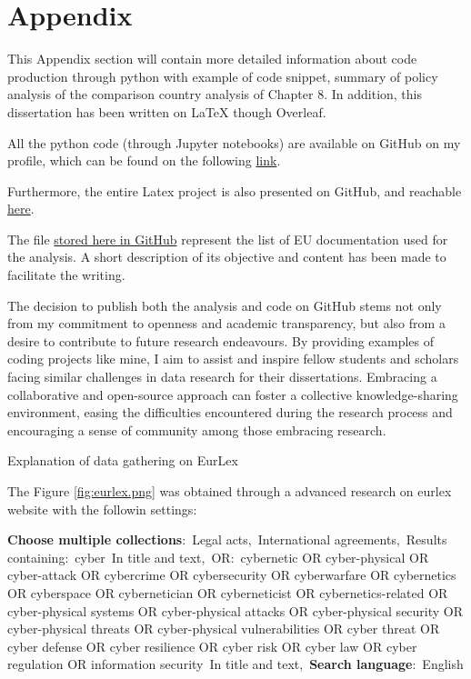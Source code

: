 \chapter*{Appendix}
{}

This Appendix section will contain more detailed information about code production through python with example of code snippet, summary of policy analysis of the comparison country analysis of Chapter 8. In addition, this dissertation has been written on LaTeX though Overleaf. 

All the python code (through Jupyter notebooks) are available on GitHub on my profile, which can be found on the following \href{https://github.com/esterinJ/Disssertation}{link}.

Furthermore, the entire Latex project is also presented on GitHub, and reachable \href{https://github.com/esterinJ/Kojtari_Cyber_Lessons_EU}{here}.

The file \href{https://github.com/esterinJ/Disssertation/blob/main/general/eu_docs.csv}{stored here in GitHub} represent the list of EU documentation used for the analysis. A short description of its objective and content has been made to facilitate the writing. 

The decision to publish both the analysis and code on GitHub stems not only from my commitment to openness and academic transparency, but also from a desire to contribute to future research endeavours. By providing examples of coding projects like mine, I aim to assist and inspire fellow students and scholars facing similar challenges in data research for their dissertations. Embracing a collaborative and open-source approach can foster a collective knowledge-sharing environment, easing the difficulties encountered during the research process and encouraging a sense of community among those embracing research.



\newpage
{}


\caption{Explanation of data gathering on EurLex}
\label{def:eurlex}
The Figure \ref{fig:eurlex.png} was obtained through a advanced research on eurlex website with the followin settings: 

\textbf{Choose multiple collections}: Legal acts, International agreements, Results containing: cyber In title and text, OR: cybernetic OR cyber-physical OR cyber-attack OR cybercrime OR cybersecurity OR cyberwarfare OR cybernetics OR cyberspace OR cybernetician OR cyberneticist OR cybernetics-related OR cyber-physical systems OR cyber-physical attacks OR cyber-physical security OR cyber-physical threats OR cyber-physical vulnerabilities OR cyber threat OR cyber defense OR cyber resilience OR cyber risk OR cyber law OR cyber regulation OR information security In title and text, \textbf{Search language}: English

